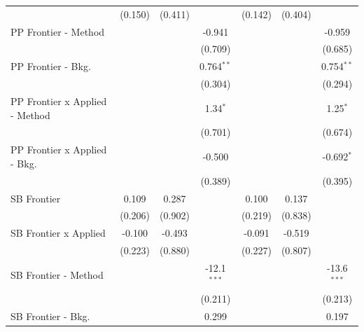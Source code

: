 \begin{tabular}{lcccccc}
                                  & (0.150)        & (0.411)       &               & (0.142)        & (0.404)      &   \\   
   PP Frontier - Method           &                &               & -0.941        &                &              & -0.959\\   
                                  &                &               & (0.709)       &                &              & (0.685)\\   
   PP Frontier - Bkg.             &                &               & 0.764$^{**}$  &                &              & 0.754$^{**}$\\   
                                  &                &               & (0.304)       &                &              & (0.294)\\   
   PP Frontier x Applied - Method &                &               & 1.34$^{*}$    &                &              & 1.25$^{*}$\\   
                                  &                &               & (0.701)       &                &              & (0.674)\\   
   PP Frontier x Applied - Bkg.   &                &               & -0.500        &                &              & -0.692$^{*}$\\   
                                  &                &               & (0.389)       &                &              & (0.395)\\   
   SB Frontier                    & 0.109          & 0.287         &               & 0.100          & 0.137        &   \\   
                                  & (0.206)        & (0.902)       &               & (0.219)        & (0.838)      &   \\   
   SB Frontier x Applied          & -0.100         & -0.493        &               & -0.091         & -0.519       &   \\   
                                  & (0.223)        & (0.880)       &               & (0.227)        & (0.807)      &   \\   
   SB Frontier - Method           &                &               & -12.1$^{***}$ &                &              & -13.6$^{***}$\\   
                                  &                &               & (0.211)       &                &              & (0.213)\\   
   SB Frontier - Bkg.             &                &               & 0.299         &                &              & 0.197\\   

\end{tabular}
